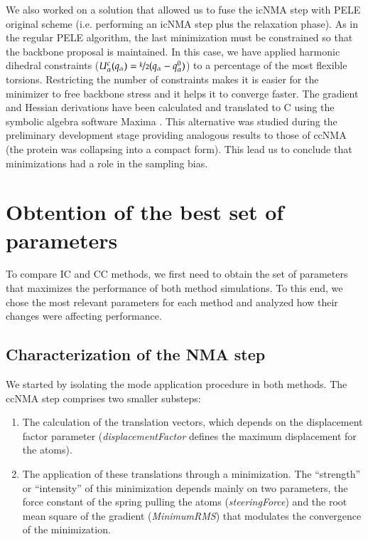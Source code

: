 We also worked on a solution that allowed us to fuse the icNMA step with PELE original scheme \cite{rincon_munoz_alisis_2014} (i.e. performing an icNMA step plus the relaxation phase). As in the regular PELE algorithm, the last minimization must be constrained so that the backbone proposal is maintained. In this case, we have applied harmonic dihedral constraints ($U_{\alpha}^c(q_\alpha) = \nicefrac{k}{2} (q_\alpha-q_\alpha^0)$) to a percentage of the most flexible torsions. Restricting the number of constraints makes it is easier for the minimizer to free backbone stress and it helps it to converge faster. The gradient and Hessian derivations have been calculated and translated to C using the symbolic algebra software Maxima \cite{maxima_maxima_2014}. This alternative was studied during the preliminary development stage providing analogous results to those of ccNMA (the protein was collapsing into a compact form). This lead us to conclude that minimizations had a role in the sampling bias. 

\section{Obtention of the best set of parameters}

To compare IC and CC methods, we first need to obtain the set of parameters that maximizes the performance of both method simulations. To this end, we chose the most relevant parameters for each method and analyzed how their changes were affecting performance.  

\subsection{Characterization of the NMA step}

We started by isolating the mode application procedure in both methods. The ccNMA step comprises two smaller substeps:
\begin{enumerate}
  \item The calculation of the translation vectors, which depends on the \calpha displacement factor parameter (\textit{displacementFactor} defines the maximum displacement for the \calpha atoms).
  \item The application of these translations through a minimization. The ``strength'' or ``intensity'' of this minimization depends mainly on two parameters, the force constant of the spring pulling the \calpha atoms (\textit{steeringForce}) and the root mean square of the gradient (\textit{MinimumRMS}) that modulates the convergence of the minimization. 
\end{enumerate}

